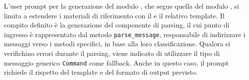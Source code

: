 L'user prompt per la generazione del modulo \parser{}, che segue quella del modulo \botnet{}, si limita a estendere i materiali di riferimento con il \schema{} e il relativo template. Il compito definito è la generazione del componente di parsing, il cui punto di ingresso è rappresentato dal metodo \texttt{parse\_message}, responsabile di indirizzare i messaggi verso i metodi specifici, in base alla loro classificazione. Qualora si verifichino errori durante il parsing, viene indicato di utilizzare il tipo di messaggio generico \texttt{Command} come fallback. Anche in questo caso, il prompt richiede il rispetto del template e del formato di output previsto.

